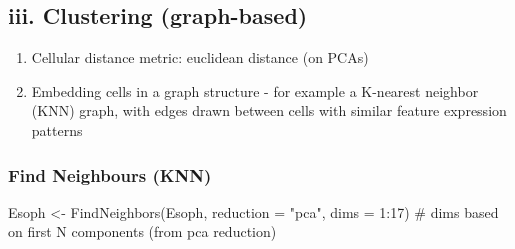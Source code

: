 \documentclass[
  letterpaper,
  DIV=11,
  numbers=noendperiod]{scrreprt}
\newenvironment{Shaded}{\begin{snugshade}}{\end{snugshade}}
\newcommand{\AttributeTok}[1]{\textcolor[rgb]{0.40,0.45,0.13}{#1}}
\newcommand{\CommentTok}[1]{\textcolor[rgb]{0.37,0.37,0.37}{#1}}
\newcommand{\ConstantTok}[1]{\textcolor[rgb]{0.56,0.35,0.01}{#1}}
\newcommand{\ControlFlowTok}[1]{\textcolor[rgb]{0.00,0.23,0.31}{\textbf{#1}}}
\newcommand{\DecValTok}[1]{\textcolor[rgb]{0.68,0.00,0.00}{#1}}
\newcommand{\FloatTok}[1]{\textcolor[rgb]{0.68,0.00,0.00}{#1}}
\newcommand{\FunctionTok}[1]{\textcolor[rgb]{0.28,0.35,0.67}{#1}}
\newcommand{\NormalTok}[1]{\textcolor[rgb]{0.00,0.23,0.31}{#1}}
\newcommand{\OtherTok}[1]{\textcolor[rgb]{0.00,0.23,0.31}{#1}}
\newcommand{\SpecialCharTok}[1]{\textcolor[rgb]{0.37,0.37,0.37}{#1}}
\newcommand{\StringTok}[1]{\textcolor[rgb]{0.13,0.47,0.30}{#1}}
\providecommand{\tightlist}{%
  \setlength{\itemsep}{0pt}\setlength{\parskip}{0pt}}\usepackage{longtable,booktabs,array}
\begin{document}
\begin{Shaded}
\end{Shaded}

\subsection{iii. Clustering
(graph-based)}\label{iii.-clustering-graph-based}

\begin{enumerate}
\def\labelenumi{\arabic{enumi}.}
\tightlist
\item
  Cellular distance metric: euclidean distance (on PCAs)
\item
  Embedding cells in a graph structure - for example a K-nearest
  neighbor (KNN) graph, with edges drawn between cells with similar
  feature expression patterns
\end{enumerate}

\subsubsection{Find Neighbours (KNN)}\label{find-neighbours-knn}

\begin{Shaded}
\begin{Highlighting}[]
\NormalTok{Esoph }\OtherTok{\textless{}{-}} \FunctionTok{FindNeighbors}\NormalTok{(Esoph, }\AttributeTok{reduction =} \StringTok{"pca"}\NormalTok{, }\AttributeTok{dims =} \DecValTok{1}\SpecialCharTok{:}\DecValTok{17}\NormalTok{) }\CommentTok{\# dims based on first N components (from pca reduction)}
\end{Highlighting}
\end{Shaded}
\end{document}
